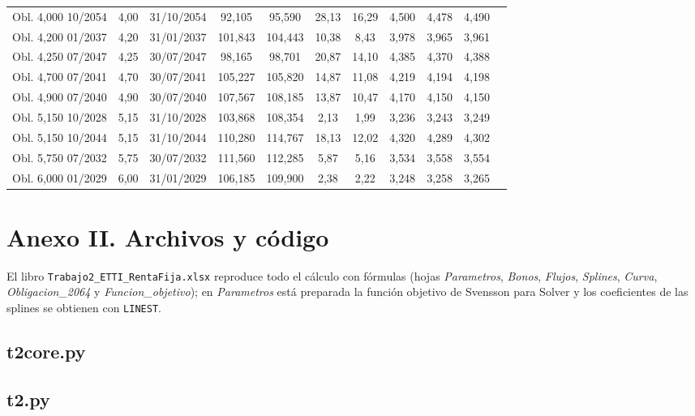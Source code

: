 \documentclass[a4paper,12pt]{article}
\begin{document}
\begin{longtable}{lcccccccccc}
Obl. 4,000 10/2054 & 4{,}00 & 31/10/2054 & 92{,}105 & 95{,}590 & 28{,}13 & 16{,}29 & 4{,}500 & 4{,}478 & 4{,}490 \\
Obl. 4,200 01/2037 & 4{,}20 & 31/01/2037 & 101{,}843 & 104{,}443 & 10{,}38 & 8{,}43 & 3{,}978 & 3{,}965 & 3{,}961 \\
Obl. 4,250 07/2047 & 4{,}25 & 30/07/2047 & 98{,}165 & 98{,}701 & 20{,}87 & 14{,}10 & 4{,}385 & 4{,}370 & 4{,}388 \\
Obl. 4,700 07/2041 & 4{,}70 & 30/07/2041 & 105{,}227 & 105{,}820 & 14{,}87 & 11{,}08 & 4{,}219 & 4{,}194 & 4{,}198 \\
Obl. 4,900 07/2040 & 4{,}90 & 30/07/2040 & 107{,}567 & 108{,}185 & 13{,}87 & 10{,}47 & 4{,}170 & 4{,}150 & 4{,}150 \\
Obl. 5,150 10/2028 & 5{,}15 & 31/10/2028 & 103{,}868 & 108{,}354 & 2{,}13 & 1{,}99 & 3{,}236 & 3{,}243 & 3{,}249 \\
Obl. 5,150 10/2044 & 5{,}15 & 31/10/2044 & 110{,}280 & 114{,}767 & 18{,}13 & 12{,}02 & 4{,}320 & 4{,}289 & 4{,}302 \\
Obl. 5,750 07/2032 & 5{,}75 & 30/07/2032 & 111{,}560 & 112{,}285 & 5{,}87 & 5{,}16 & 3{,}534 & 3{,}558 & 3{,}554 \\
Obl. 6,000 01/2029 & 6{,}00 & 31/01/2029 & 106{,}185 & 109{,}900 & 2{,}38 & 2{,}22 & 3{,}248 & 3{,}258 & 3{,}265 \\
\bottomrule\end{longtable}
\normalsize
\section*{Anexo II. Archivos y código}
El libro \texttt{Trabajo2\_ETTI\_RentaFija.xlsx} reproduce todo el cálculo con fórmulas (hojas \emph{Parametros}, \emph{Bonos}, \emph{Flujos}, \emph{Splines}, \emph{Curva}, \emph{Obligacion\_2064} y \emph{Funcion\_objetivo}); en \emph{Parametros} está preparada la función objetivo de Svensson para Solver y los coeficientes de las splines se obtienen con \texttt{LINEST}.
\subsection*{t2core.py}

\subsection*{t2.py}

\end{document}
